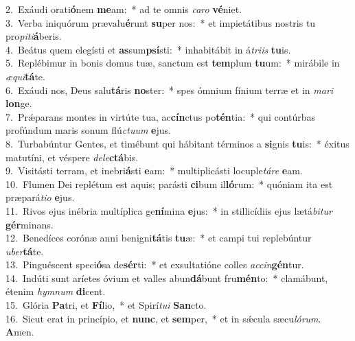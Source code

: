 {2.~}Exáudi orati\textbf{ó}nem \textbf{me}am:~* ad te omnis \textit{ca}\textit{ro} \textbf{vé}niet.\\
{3.~}Verba iniquórum prævalu\textbf{é}runt \textbf{su}per nos:~* et impietátibus nostris tu pro\textit{pi}\textit{ti}\textbf{á}beris.\\
{4.~}Beátus quem elegísti et \textbf{as}sum\textbf{psí}sti:~* inhabitábit in á\textit{tri}\textit{is} \textbf{tu}is.\\
{5.~}Replébimur in bonis domus tuæ, sanctum est \textbf{tem}plum \textbf{tu}um:~* mirábile in \textit{æ}\textit{qui}\textbf{tá}te.\\
{6.~}Exáudi nos, Deus salu\textbf{tá}ris \textbf{no}ster:~* spes ómnium fínium terræ et in \textit{ma}\textit{ri} \textbf{lon}ge.\\
{7.~}Prǽparans montes in virtúte tua, ac\textbf{cín}ctus po\textbf{tén}tia:~* qui contúrbas profúndum maris sonum flú\textit{ctu}\textit{um} \textbf{e}jus.\\
{8.~}Turbabúntur Gentes, et timébunt qui hábitant términos a \textbf{si}gnis \textbf{tu}is:~* éxitus matutíni, et véspere \textit{de}\textit{le}\textbf{ctá}bis.\\
{9.~}Visitásti terram, et inebri\textbf{á}sti \textbf{e}am:~* multiplicásti locuple\textit{tá}\textit{re} \textbf{e}am.\\
{10.~}Flumen Dei replétum est aquis; parásti \textbf{ci}bum il\textbf{ló}rum:~* quóniam ita est præpará\textit{ti}\textit{o} \textbf{e}jus.\\
{11.~}Rivos ejus inébria multíplica ge\textbf{ní}mina \textbf{e}jus:~* in stillicídiis ejus lætá\textit{bi}\textit{tur} \textbf{gér}minans.\\
{12.~}Benedíces corónæ anni benigni\textbf{tá}tis \textbf{tu}æ:~* et campi tui replebúntur \textit{u}\textit{ber}\textbf{tá}te.\\
{13.~}Pinguéscent speci\textbf{ó}sa de\textbf{sér}ti:~* et exsultatióne colles \textit{ac}\textit{cin}\textbf{gén}tur.\\
{14.~}Indúti sunt aríetes óvium et valles abun\textbf{dá}bunt fru\textbf{mén}to:~* clamábunt, étenim \textit{hym}\textit{num} \textbf{di}cent.\\
{15.~}Glória \textbf{Pa}tri, et \textbf{Fí}lio,~* et Spirí\textit{tu}\textit{i} \textbf{San}cto.\\
{16.~}Sicut erat in princípio, et \textbf{nunc}, et \textbf{sem}per,~* et in sǽcula sæcu\textit{ló}\textit{rum}. \textbf{A}men.\\
